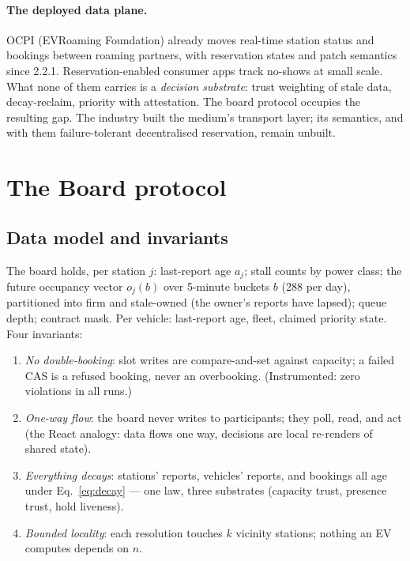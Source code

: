 \documentclass[twoside,twocolumn,usenatbib]{mnras}
\begin{document}
\paragraph{The deployed data plane.}  OCPI (EVRoaming Foundation)
already moves real-time station status and bookings between roaming
partners, with reservation states and patch semantics since 2.2.1.
Reservation-enabled consumer apps track no-shows at small scale.
What none of them carries is a \emph{decision substrate}: trust
weighting of stale data, decay-reclaim, priority with attestation.
The board protocol occupies the resulting gap.  The industry
built the medium's transport layer; its semantics, and with them
failure-tolerant decentralised reservation, remain unbuilt.

\section{The Board protocol}

\label{sec:protocol}

\subsection{Data model and invariants}

The board holds, per station $j$: last-report age $a_j$; stall counts
by power class; the future occupancy vector $o_j(b)$ over 5-minute
buckets $b$ (288 per day), partitioned into firm and stale-owned
(the owner's reports have lapsed); queue depth; contract mask.  Per
vehicle: last-report age, fleet, claimed priority state.  Four
invariants:

\begin{enumerate}
\item[\textbf{I1}] \emph{No double-booking}: slot writes are
compare-and-set against capacity; a failed CAS is a refused booking,
never an overbooking.  (Instrumented: zero violations in all runs.)
\item[\textbf{I2}] \emph{One-way flow}: the board never writes to
participants; they poll, read, and act (the React analogy: data
flows one way, decisions are local re-renders of shared state).
\item[\textbf{I3}] \emph{Everything decays}: stations' reports,
vehicles' reports, and bookings all age under Eq.~\ref{eq:decay} ---
one law, three substrates (capacity trust, presence trust, hold
liveness).
\item[\textbf{I4}] \emph{Bounded locality}: each resolution touches
$k$ vicinity stations; nothing an EV computes depends on $n$.
\end{enumerate}
\end{document}
